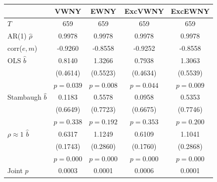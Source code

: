 \begin{tabular}{lcccc}
\toprule
 & VWNY & EWNY & ExcVWNY & ExcEWNY \\
\midrule
$T$ & 659 & 659 & 659 & 659 \\
AR(1) $\hat\rho$ & 0.9978 & 0.9978 & 0.9978 & 0.9978 \\
corr($e,m$) & -0.9260 & -0.8558 & -0.9252 & -0.8558 \\
\midrule
OLS $\hat b$ & 0.8140 & 1.3266 & 0.7938 & 1.3063 \\
 & (0.4614) & (0.5523) & (0.4634) & (0.5539) \\
 & $p=0.039$ & $p=0.008$ & $p=0.044$ & $p=0.009$ \\
Stambaugh $\hat b$ & 0.1183 & 0.5578 & 0.0958 & 0.5353 \\
 & (0.6649) & (0.7723) & (0.6675) & (0.7746) \\
 & $p=0.338$ & $p=0.192$ & $p=0.353$ & $p=0.200$ \\
$\rho\approx1$ $\hat b$ & 0.6317 & 1.1249 & 0.6109 & 1.1041 \\
 & (0.1743) & (0.2860) & (0.1760) & (0.2868) \\
 & $p=0.000$ & $p=0.000$ & $p=0.000$ & $p=0.000$ \\
\midrule
Joint $p$ & 0.0003 & 0.0001 & 0.0006 & 0.0001 \\
\bottomrule
\end{tabular}
